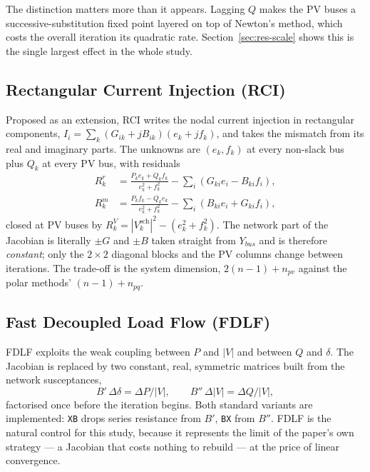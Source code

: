 \documentclass[sigconf,nonacm]{acmart}
\begin{document}
The distinction matters more than it appears. Lagging $Q$ makes the PV buses a
successive-substitution fixed point layered on top of Newton's method, which
costs the overall iteration its quadratic rate. Section~\ref{sec:res-scale}
shows this is the single largest effect in the whole study.

\subsection{Rectangular Current Injection (RCI)}
Proposed as an extension, RCI writes the nodal current injection in rectangular
components, $I_i = \sum_k (G_{ik}+jB_{ik})(e_k+jf_k)$, and takes the mismatch
from its real and imaginary parts. The unknowns are $(e_k,f_k)$ at every
non-slack bus plus $Q_k$ at every PV bus, with residuals
\begin{align}
R^{r}_{k} &= \frac{P_k e_k + Q_k f_k}{e_k^{2}+f_k^{2}}
             - \sum_i \left(G_{ki}e_i - B_{ki}f_i\right), \\
R^{m}_{k} &= \frac{P_k f_k - Q_k e_k}{e_k^{2}+f_k^{2}}
             - \sum_i \left(B_{ki}e_i + G_{ki}f_i\right),
\end{align}
closed at PV buses by
$R^{V}_{k} = |V^{\mathrm{sch}}_k|^{2} - (e_k^{2}+f_k^{2})$. The network part of
the Jacobian is literally $\pm G$ and $\pm B$ taken straight from $Y_{bus}$ and
is therefore \emph{constant}; only the $2\times2$ diagonal blocks and the PV
columns change between iterations. The trade-off is the system dimension,
$2(n-1)+n_{pv}$ against the polar methods' $(n-1)+n_{pq}$.

\subsection{Fast Decoupled Load Flow (FDLF)}
FDLF exploits the weak coupling between $P$ and $|V|$ and between $Q$ and
$\delta$. The Jacobian is replaced by two constant, real, symmetric matrices
built from the network susceptances,
\begin{equation}
B'\,\Delta\delta = \Delta P/|V| , \qquad
B''\,\Delta|V| = \Delta Q/|V| ,
\end{equation}
factorised once before the iteration begins. Both standard variants are
implemented: \texttt{XB} drops series resistance from $B'$, \texttt{BX} from
$B''$. FDLF is the natural control for this study, because it represents the
limit of the paper's own strategy --- a Jacobian that costs nothing to rebuild
--- at the price of linear convergence.
\end{document}
